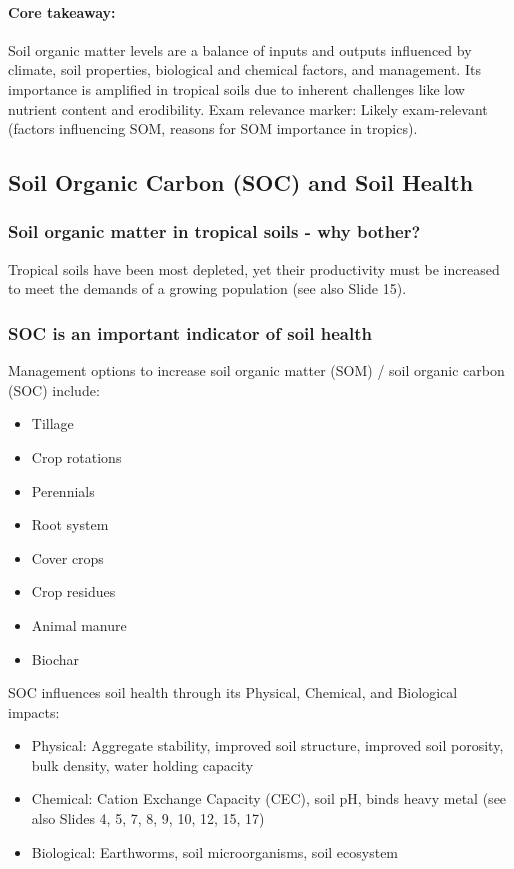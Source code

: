 \paragraph*{Core takeaway:} 
Soil organic matter levels are a balance of inputs and outputs influenced by climate, soil properties, biological and chemical factors, and management. Its importance is amplified in tropical soils due to inherent challenges like low nutrient content and erodibility. Exam relevance marker: Likely exam-relevant (factors influencing SOM, reasons for SOM importance in tropics).

\subsection{Soil Organic Carbon (SOC) and Soil Health} \subsubsection{Soil organic matter in tropical soils - why bother?} 
Tropical soils have been most depleted, yet their productivity must be increased to meet the demands of a growing population (see also Slide 15).

\subsubsection{SOC is an important indicator of soil health}  
Management options to increase soil organic matter (SOM) / soil organic carbon (SOC) include: 

\begin{itemize} 
    \item Tillage 
    \item Crop rotations 
    \item Perennials 
    \item Root system 
    \item Cover crops 
    \item Crop residues 
    \item Animal manure 
    \item Biochar 
\end{itemize} 

\vspace*{1em}
SOC influences soil health through its Physical, Chemical, and Biological impacts: 

\begin{itemize} 
    \item Physical: Aggregate stability, improved soil structure, improved soil porosity, bulk density, water holding capacity 
    \item Chemical: Cation Exchange Capacity (CEC), soil pH, binds heavy metal (see also Slides 4, 5, 7, 8, 9, 10, 12, 15, 17) 
    \item Biological: Earthworms, soil microorganisms, soil ecosystem 
\end{itemize}

